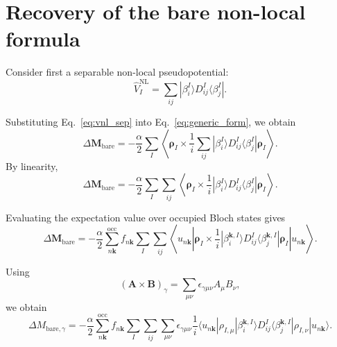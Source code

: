 \documentclass[11pt]{article}
\begin{document}
\section{Recovery of the bare non-local formula}

Consider first a separable non-local pseudopotential:
\begin{equation}
\hat V_I^{\mathrm{NL}}
=
\sum_{ij}
|\beta_i^I\rangle D_{ij}^I \langle \beta_j^I| .
\label{eq:vnl_sep}
\end{equation}

Substituting Eq.~\eqref{eq:vnl_sep} into Eq.~\eqref{eq:generic_form}, we obtain
\begin{equation}
\Delta \mathbf{M}_{\mathrm{bare}}
=
-\frac{\alpha}{2}
\sum_I
\left\langle
\bm{\rho}_I \times \frac{1}{i}
\sum_{ij}
|\beta_i^I\rangle D_{ij}^I \langle \beta_j^I|
\bm{\rho}_I
\right\rangle .
\end{equation}
By linearity,
\begin{equation}
\Delta \mathbf{M}_{\mathrm{bare}}
=
-\frac{\alpha}{2}
\sum_I \sum_{ij}
\left\langle
\bm{\rho}_I \times \frac{1}{i}
|\beta_i^I\rangle D_{ij}^I \langle \beta_j^I|
\bm{\rho}_I
\right\rangle .
\end{equation}

Evaluating the expectation value over occupied Bloch states gives
\begin{equation}
\Delta \mathbf{M}_{\mathrm{bare}}
=
-\frac{\alpha}{2}
\sum_{n\mathbf{k}}^{\mathrm{occ}} f_{n\mathbf{k}}
\sum_I \sum_{ij}
\left\langle u_{n\mathbf{k}} \left|
\bm{\rho}_I \times \frac{1}{i}
|\beta_i^{\mathbf{k},I}\rangle D_{ij}^I
\langle \beta_j^{\mathbf{k},I}|
\bm{\rho}_I
\right| u_{n\mathbf{k}} \right\rangle .
\label{eq:bare_exp}
\end{equation}

Using
\begin{equation}
(\mathbf{A}\times\mathbf{B})_\gamma
=
\sum_{\mu\nu}
\epsilon_{\gamma\mu\nu} A_\mu B_\nu ,
\label{eq:cross_components}
\end{equation}
we obtain
\begin{equation}
\Delta M_{\mathrm{bare},\gamma}
=
-\frac{\alpha}{2}
\sum_{n\mathbf{k}}^{\mathrm{occ}} f_{n\mathbf{k}}
\sum_I \sum_{ij} \sum_{\mu\nu}
\epsilon_{\gamma\mu\nu}
\frac{1}{i}
\langle u_{n\mathbf{k}} | \rho_{I,\mu} | \beta_i^{\mathbf{k},I} \rangle
D_{ij}^I
\langle \beta_j^{\mathbf{k},I} | \rho_{I,\nu} | u_{n\mathbf{k}} \rangle .
\label{eq:bare_components}
\end{equation}
\end{document}
